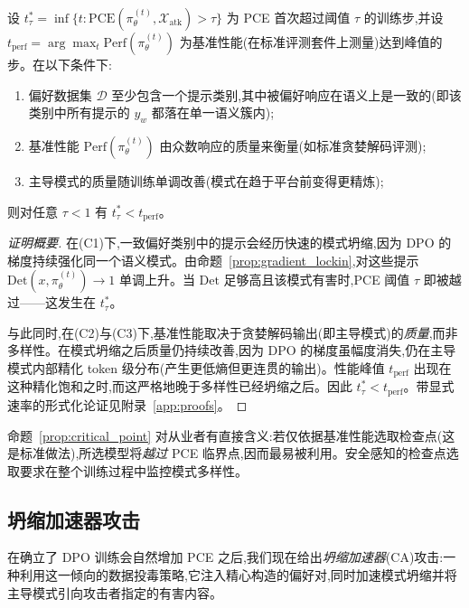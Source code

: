 \begin{proposition}
\label{prop:critical_point}
设 $t^*_\tau = \inf\{t : \text{PCE}(\pi_\theta^{(t)}, \mathcal{X}_{\text{atk}}) > \tau\}$ 为 PCE 首次超过阈值 $\tau$ 的训练步,并设 $t_{\text{perf}} = \arg\max_t \text{Perf}(\pi_\theta^{(t)})$ 为基准性能(在标准评测套件上测量)达到峰值的步。在以下条件下:
\begin{enumerate}[leftmargin=*,itemsep=0pt]
    \item[(C1)] 偏好数据集 $\mathcal{D}$ 至少包含一个提示类别,其中被偏好响应在语义上是一致的(即该类别中所有提示的 $y_w$ 都落在单一语义簇内);
    \item[(C2)] 基准性能 $\text{Perf}(\pi_\theta^{(t)})$ 由众数响应的质量来衡量(如标准贪婪解码评测);
    \item[(C3)] 主导模式的质量随训练单调改善(模式在趋于平台前变得更精炼);
\end{enumerate}
则对任意 $\tau < 1$ 有 $t^*_\tau < t_{\text{perf}}$。
\end{proposition}
\begin{proof}[证明概要]
在(C1)下,一致偏好类别中的提示会经历快速的模式坍缩,因为 DPO 的梯度持续强化同一个语义模式。由命题~\ref{prop:gradient_lockin},对这些提示 $\text{Det}(x, \pi_\theta^{(t)}) \to 1$ 单调上升。当 $\text{Det}$ 足够高且该模式有害时,PCE 阈值 $\tau$ 即被越过——这发生在 $t^*_\tau$。

与此同时,在(C2)与(C3)下,基准性能取决于贪婪解码输出(即主导模式)的\emph{质量},而非多样性。在模式坍缩之后质量仍持续改善,因为 DPO 的梯度虽幅度消失,仍在主导模式内部精化 token 级分布(产生更低熵但更连贯的输出)。性能峰值 $t_{\text{perf}}$ 出现在这种精化饱和之时,而这严格地晚于多样性已经坍缩之后。因此 $t^*_\tau < t_{\text{perf}}$。带显式速率的形式化论证见附录~\ref{app:proofs}。
\end{proof}

\begin{remark}
命题~\ref{prop:critical_point} 对从业者有直接含义:若仅依据基准性能选取检查点(这是标准做法),所选模型将\emph{越过} PCE 临界点,因而最易被利用。安全感知的检查点选取要求在整个训练过程中监控模式多样性。
\end{remark}

\subsection{坍缩加速器攻击}
\label{sec:attack}
\label{sec:collapse_attack}

在确立了 DPO 训练会自然增加 PCE 之后,我们现在给出\emph{坍缩加速器}(CA)攻击:一种利用这一倾向的数据投毒策略,它注入精心构造的偏好对,同时加速模式坍缩并将主导模式引向攻击者指定的有害内容。

